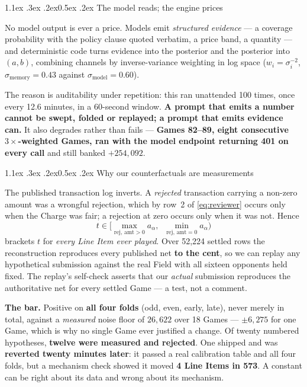 \documentclass[9pt,a4paper,twocolumn]{article}
\makeatletter
\renewcommand\section{\@startsection{section}{1}{\z@}%
  {1.1ex \@plus .3ex \@minus .2ex}{0.5ex \@plus .2ex}%
  {\normalfont\normalsize\bfseries}}
\newcommand{\charge}{a}
\newcommand{\limitv}{b}
\newcommand{\fair}{t}
\makeatother
\begin{document}
\section{The model reads; the engine prices}

No model output is ever a price. Models emit \emph{structured evidence} --- a coverage probability
with the policy clause quoted verbatim, a price band, a quantity --- and deterministic code turns
evidence into the posterior and the posterior into $(\charge,\limitv)$, combining channels by
inverse-variance weighting in log space ($w_i=\sigma_i^{-2}$, $\sigma_{\text{memory}}=0.43$ against
$\sigma_{\text{model}}=0.60$).

The reason is auditability under repetition: this ran unattended 100 times, once every 12.6
minutes, in a 60-second window. \textbf{A prompt that emits a number cannot be swept, folded or
replayed; a prompt that emits evidence can.} It also degrades rather than fails --- \textbf{Games
82--89, eight consecutive $3\times$-weighted Games, ran with the model endpoint returning 401 on
every call} and still banked $+254{,}092$.

\section{Why our counterfactuals are measurements}

The published transaction log inverts. A \emph{rejected} transaction carrying a non-zero amount was
a wrongful rejection, which by row~2 of \eqref{eq:reviewer} occurs only when the Charge was fair; a
rejection at zero occurs only when it was not. Hence
\begin{equation}
\boxed{\;\fair\in\Big[\max_{\text{rej},\,\text{amt}>0}\charge_\alpha,\;\;
\min_{\text{rej},\,\text{amt}=0}\charge_\alpha\Big)\;}
\label{eq:inversion}
\end{equation}
brackets $\fair$ for \emph{every Line Item ever played}. Over 52{,}224 settled rows the
reconstruction reproduces every published net \textbf{to the cent}, so we can replay any
hypothetical submission against the real Field with all sixteen opponents held fixed. The replay's
self-check asserts that our \emph{actual} submission reproduces the authoritative net for every
settled Game --- a test, not a comment.

\textbf{The bar.} Positive on \textbf{all four folds} (odd, even, early, late), never merely in
total, against a \emph{measured} noise floor of $26{,}622$ over 18 Games --- $\pm6{,}275$ for one
Game, which is why no single Game ever justified a change. Of twenty numbered hypotheses,
\textbf{twelve were measured and rejected}. One shipped and was \textbf{reverted twenty minutes
later}: it passed a real calibration table and all four folds, but a mechanism check showed it
moved \textbf{4 Line Items in 573}. A constant can be right about its data and wrong about its
mechanism.
\end{document}
